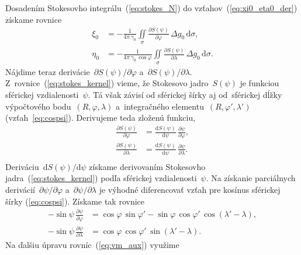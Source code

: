 \documentclass[a4paper, 12pt]{book}
\newcommand{\diff}{\mathrm d}
\begin{document}
Dosadením Stokesovho integrálu~(\ref{eq:stokes_N}) do 
vzťahov~(\ref{eq:xi0_eta0_der}) získame rovnice
%
\begin{equation}
\label{eq:vm}
\begin{split}
\xi_0 &= -\frac{1}{4\pi\,\gamma_0} \iint\limits_\sigma \frac{\partial 
S(\psi)}{\partial \varphi} \, \Delta g_0 \, \diff\sigma{,}\\
\eta_0 &= -\frac{1}{4\pi \, \gamma_0 \, \cos\varphi} \iint\limits_\sigma 
\frac{\partial S(\psi)}{\partial \lambda} \, \Delta g_0 \, \diff\sigma{.}
\end{split}
\end{equation}
%
Nájdime teraz derivácie~$\partial S(\psi) \slash \partial\varphi$ a~$\partial 
S(\psi) \slash \partial\lambda$.  Z~rovnice~(\ref{eq:stokes_kernel}) vieme, že 
Stokesovo jadro~$S(\psi)$ je funkciou sférickej vzdialenosti~$\psi$.  Tá však 
závisí od sférickej šírky aj od~sférickej dĺžky výpočtového bodu~$(R, \varphi, 
\lambda)$ a~integračného elementu~$(R, \varphi', \lambda')$ 
(vzťah~\ref{eq:cospsi}).  Derivujeme teda zloženú funkciu,
%
\begin{equation}
\label{eq:stokes_kernel_partials}
\begin{split}
\frac{\partial S(\psi)}{\partial \varphi} &= \frac{\diff S(\psi)}{\diff \psi} 
\, \frac{\partial\psi}{\partial\varphi}{,}\\
%
\frac{\partial S(\psi)}{\partial \lambda} &= \frac{\diff S(\psi)}{\diff \psi} 
\, \frac{\partial\psi}{\partial\lambda}{.}\\
\end{split}
\end{equation}
%
Deriváciu~$\diff S(\psi) \slash \diff \psi$ získame derivovaním Stokesovho 
jadra~(\ref{eq:stokes_kernel}) podľa sférickej vzdialenosti~$\psi$.  Na 
získanie parciálnych derivácií~$\partial\psi \slash \partial\varphi$ 
a~$\partial\psi \slash \partial\lambda$ je výhodné diferencovať vzťah pre 
kosínus sférickej šírky (\ref{eq:cospsi}).  Získame tak rovnice
%
\begin{equation}
\label{eq:vm_aux}
\begin{split}
-\sin\psi \, \frac{\partial \psi}{\partial \varphi} &= \cos\varphi \, 
\sin\varphi' - \sin\varphi \, \cos\varphi' \, \cos(\lambda' - \lambda) {,}\\
-\sin\psi \, \frac{\partial \psi}{\partial \lambda} &= \cos\varphi \, 
\cos\varphi' \, \sin(\lambda' - \lambda){.}
\end{split}
\end{equation}
%
Na ďalšiu úpravu rovníc~(\ref{eq:vm_aux}) využime 
\end{document}
